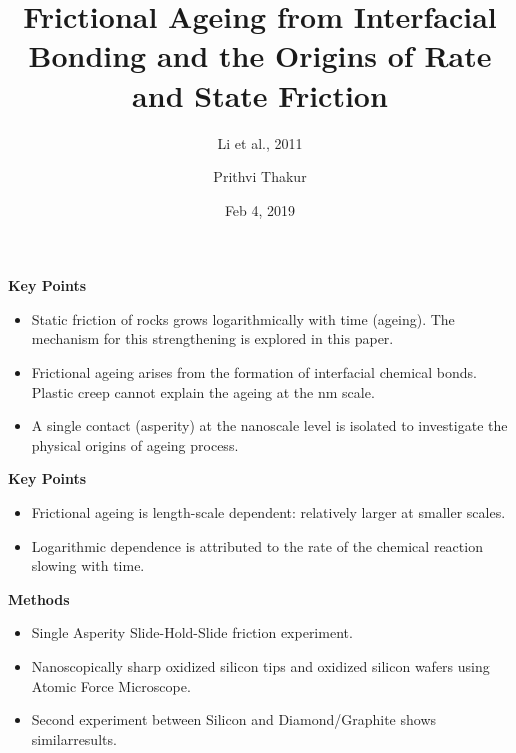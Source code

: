 \documentclass[11pt]{beamer}
\title{\textbf{Frictional Ageing from Interfacial Bonding and the Origins of Rate and State Friction}}
\date{Feb 4, 2019}
\author{Prithvi Thakur}
\subtitle{Li et al., 2011}
\begin{document}
\maketitle

\linespread{1.3}

\begin{frame}{\textbf{Key Points}}
    \begin{itemize}
        \item Static friction of rocks grows logarithmically with time (ageing). The mechanism for this strengthening is explored in this paper.
        \item Frictional ageing arises from the formation of interfacial chemical bonds. Plastic creep cannot explain the ageing at the nm scale.
        \item A single contact (asperity) at the nanoscale level is isolated to investigate the physical origins of ageing process.
    \end{itemize}
\end{frame}
\begin{frame}{\textbf{Key Points}}
    \begin{itemize}
        \item Frictional ageing is length-scale dependent: relatively larger at smaller scales.
        \item Logarithmic dependence is attributed to the rate of the chemical reaction slowing with time.
    \end{itemize}
\end{frame}

\begin{frame}{\textbf{Methods}}
    \begin{itemize}
        \item Single Asperity Slide-Hold-Slide friction experiment.
        \item Nanoscopically sharp oxidized silicon tips and oxidized silicon wafers using Atomic Force Microscope.
        \item Second experiment between Silicon and Diamond/Graphite shows similarresults.
    \end{itemize}
\end{frame}
\end{document}
